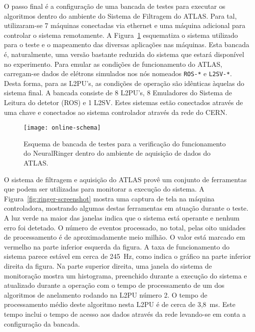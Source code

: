 O passo final é a configuração de uma bancada de testes para executar os
algoritmos dentro do ambiente do Sistema de Filtragem do ATLAS. Para tal,
utilizaram-se 7 máquinas conectadas via  ethernet e uma máquina
adicional para controlar o sistema remotamente.  A
Figura~\ref{fig:online-schema} esquematiza o sistema utilizado para o teste e
o mapeamento das diversas aplicações nas máquinas. Esta bancada é,
naturalmente, uma versão bastante reduzida do sistema que estará disponível no
experimento. Para emular as condições de funcionamento do ATLAS, carregam-se
dados de elétrons simulados nos nós nomeados \texttt{ROS-*} e
\texttt{L2SV-*}. Desta forma, para as L2PU's, as condições de operação são
idênticas àquelas do sistema final. A bancada consiste de 8 L2PU's, 8
Emuladores do Sistema de Leitura do detetor (ROS) e 1 L2SV. Estes sistemas
estão conectados através de uma chave  e conectados ao
sistema controlador através da rede do CERN.

\begin{figure}
\begin{center}
\texttt{[image: online-schema]}
\end{center}
\caption{Esquema de bancada de testes para a verificação do funcionamento do
NeuralRinger dentro do ambiente de aquisição de dados do ATLAS.}
\label{fig:online-schema}
\end{figure}

O sistema de filtragem e aquisição do ATLAS provê um conjunto de ferramentas
que podem ser utilizadas para monitorar a execução do sistema. A
Figura~\ref{fig:ringer-screenshot} mostra uma captura de tela na máquina
controladora, mostrando algumas destas ferramentas em atuação durante o
teste. A luz verde na maior das janelas indica que o sistema está operante e
nenhum erro foi detetado. O número de eventos processado, no total, pelas oito
unidades de processamento é de aproximadamente meio milhão. O valor está
marcado em vermelho na parte inferior esquerda da figura. A taxa de
funcionamento do sistema parece estável em cerca de 245~Hz, como indica o
gráfico na parte inferior direita da figura. Na parte superior direita, uma
janela do sistema de monitoração  mostra um histograma, preenchido
durante a execução do sistema e atualizado durante a operação com o tempo de
processamento de um dos algoritmos de anelamento rodando na L2PU número 2. O
tempo de processamento médio deste algoritmo nesta L2PU é de cerca de
3,8~ms. Este tempo inclui o tempo de acesso aos dados através da rede
 levando-se em conta a configuração da bancada.

